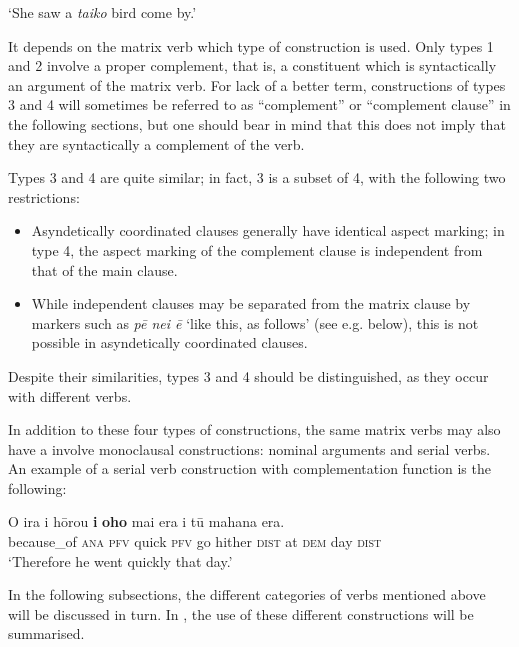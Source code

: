 \glt
‘She saw a \textit{taiko} bird come by.’ \textstyleExampleref{[Ley-9-55.078]}
\z


It depends on the matrix verb which type of construction is used. Only types 1 and 2 involve a proper complement, that is, a constituent which is syntactically an argument of the matrix verb. For lack of a better term, constructions of types 3 and 4 will sometimes be referred to as “complement” or “complement clause” in the following sections, but one should bear in mind that this does not imply that they are syntactically a complement of the verb.

Types 3 and 4 are quite similar; in fact, 3 is a subset of 4, with the following two restrictions:

\begin{itemize}
\item 
Asyndetically coordinated clauses generally have identical aspect marking; in type 4, the aspect marking of the complement clause is independent from that of the main clause.

\item 
While independent clauses may be separated from the matrix clause by markers such as \textit{pē nei ē} ‘like this, as follows’ (see e.g.  below), this is not possible in asyndetically coordinated clauses.

\end{itemize}

Despite their similarities, types 3 and 4 should be distinguished, as they occur with different verbs.

In addition to these four types of constructions, the same matrix verbs may also have a involve monoclausal constructions: nominal arguments and serial verbs. An example of a serial verb construction with complementation function is the following:

\ea\label{ex:11.32}
\gll {\ꞌ}O ira i hōrou \textbf{i} \textbf{oho} mai era {\ꞌ}i tū mahana era. \\
because\_of \textsc{ana} \textsc{pfv} quick \textsc{pfv} go hither \textsc{dist} at \textsc{dem} day \textsc{dist} \\

\glt
‘Therefore he went quickly that day.’ \textstyleExampleref{[R105.108]} 
\z

In the following subsections, the different categories of verbs mentioned above will be discussed in turn. In , the use of these different constructions will be summarised.

